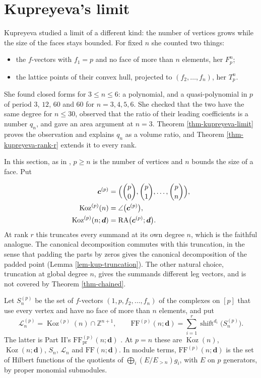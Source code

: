 \documentclass[11pt, a4paper, abstract=yes]{scrartcl}
\theoremstyle{definition}
\theoremstyle{remark}
\theoremstyle{plain}
\newcommand{\vek}[1]{\boldsymbol{#1}}
\theoremstyle{remark}
\theoremstyle{plain}
\newcommand{\Koz}{\operatorname{Koz}}
\newcommand{\shift}{\operatorname{shift}}
\newcommand{\rasimp}{\angle}
\newcommand{\RA}{\operatorname{RA}}
\newcommand{\FF}{\mathrm{FF}}
\let\autocite\cite
\begin{document}
\section{Kupreyeva's limit}
\label{sec-kupreyeva}
Kupreyeva \autocite[Section 6.2]{Kupreyeva2019} studied a limit of a different kind: the number of
vertices grows while the size of the faces stays bounded. For fixed \(n\) she counted two things:
\begin{itemize}
\item the \(f\)-vectors with \(f_1=p\) and no face of more than \(n\) elements, her \(F^n_p\);
\item the lattice points of their convex hull, projected to \((f_2,\dots,f_n)\), her \(T^n_p\).
\end{itemize}

She found closed forms for \(3\le n\le6\): a polynomial, and a quasi-polynomial in \(p\) of period
\(3\), \(12\), \(60\) and \(60\) for \(n=3,4,5,6\). She checked that the two have the same degree for
\(n\le30\), observed that the ratio of their leading coefficients is a number \(q_n\), and gave an
area argument at \(n=3\). Theorem \ref{thm-kupreyeva-limit} proves the observation and explains
\(q_n\) as a volume ratio, and Theorem \ref{thm-kupreyeva-rank-r} extends it to every rank.

In this section, as in \autocite[Section 9]{SnellmanArticle2}, \(p\ge n\) is the number of vertices and
\(n\) bounds the size of a face. Put

\begin{equation}\label{eq:kup-defs}
\begin{aligned}
  \vek c^{(p)}&=\Bigl(\binom p0,\binom p1,\dots,\binom pn\Bigr),\\
  \Koz^{(p)}(n)&=\rasimp\bigl(\vek c^{(p)}\bigr),\\
  \Koz^{(p)}(n;\vek d)&=\RA\bigl(\vek c^{(p)};\vek d\bigr).
\end{aligned}
\end{equation}
At rank \(r\) this truncates every summand at its own degree \(n\), which is the faithful analogue.
The canonical decomposition commutes with this truncation, in the sense that padding the parts by
zeros gives the canonical decomposition of the padded point (Lemma \ref{lem-kup-truncation}). The other
natural choice, truncation at global degree \(n\), gives the summands different leg vectors, and is
not covered by Theorem \ref{thm-chained}.

Let \(S_n^{(p)}\) be the set of \(f\)-vectors \((1,p,f_2,\dots,f_n)\) of the complexes on \([p]\)
that use every vertex and have no face of more than \(n\) elements, and put
\begin{equation}\label{eq:kup-sets}
  \mathcal L_n^{(p)}=\Koz^{(p)}(n)\cap\mathbb Z^{n+1},\qquad
  \FF^{(p)}(n;\vek d)=\sum_{i=1}^r\shift^{d_i}\bigl(S_n^{(p)}\bigr).
\end{equation}
The latter is Part II's \(\FF^{(p)}_{\mathrm{pr}}(n;\vek d)\) \autocite[Theorem 60]{SnellmanArticle2}. At \(p=n\) these are
\(\Koz(n)\), \(\Koz(n;\vek d)\), \(S_n\), \(\mathcal L_n\) and \(\FF(n;\vek d)\). In module terms,
\(\FF^{(p)}(n;\vek d)\) is the set of Hilbert functions of the quotients of
\(\bigoplus_i(E/E_{>n})g_i\), with \(E\) on \(p\) generators, by proper monomial submodules.
\end{document}
